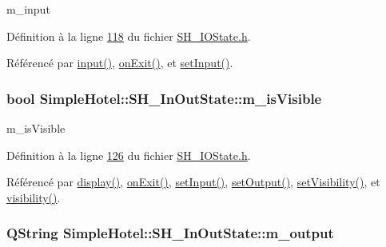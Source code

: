 m\-\_\-input 



Définition à la ligne \hyperlink{SH__IOState_8h_source_l00118}{118} du fichier \hyperlink{SH__IOState_8h_source}{S\-H\-\_\-\-I\-O\-State.\-h}.



Référencé par \hyperlink{classSimpleHotel_1_1SH__InOutState_a487d2ca6200fed372b1a27cfa27774db}{input()}, \hyperlink{classSimpleHotel_1_1SH__InOutState_aa5fc1b9281087bd8abcd6873d2a36009}{on\-Exit()}, et \hyperlink{classSimpleHotel_1_1SH__InOutState_a30d45824ca3c749427ac8d40479cf072}{set\-Input()}.

\hypertarget{classSimpleHotel_1_1SH__InOutState_a041ad53f3cdfb1b18ee002597e833848}{
\subsubsection[{m\-\_\-is\-Visible}]{\setlength{\rightskip}{0pt plus 5cm}bool Simple\-Hotel\-::\-S\-H\-\_\-\-In\-Out\-State\-::m\-\_\-is\-Visible\hspace{0.3cm}{\ttfamily [private]}}}\label{classSimpleHotel_1_1SH__InOutState_a041ad53f3cdfb1b18ee002597e833848}


m\-\_\-is\-Visible 



Définition à la ligne \hyperlink{SH__IOState_8h_source_l00126}{126} du fichier \hyperlink{SH__IOState_8h_source}{S\-H\-\_\-\-I\-O\-State.\-h}.



Référencé par \hyperlink{classSimpleHotel_1_1SH__InOutState_a1cbe5befe4f42e0941165498ed0117a9}{display()}, \hyperlink{classSimpleHotel_1_1SH__InOutState_aa5fc1b9281087bd8abcd6873d2a36009}{on\-Exit()}, \hyperlink{classSimpleHotel_1_1SH__InOutState_a30d45824ca3c749427ac8d40479cf072}{set\-Input()}, \hyperlink{classSimpleHotel_1_1SH__InOutState_a5e151d7b01cceb6766b6d83d4a9ac1aa}{set\-Output()}, \hyperlink{classSimpleHotel_1_1SH__InOutState_a2da1edbe247e9b2661c81c9dc2c7ef8d}{set\-Visibility()}, et \hyperlink{classSimpleHotel_1_1SH__InOutState_a145a6e0e2c9e22971e35aa4538adeb4a}{visibility()}.

\hypertarget{classSimpleHotel_1_1SH__InOutState_ab3dc360d32c8da2b958f8cdda90a8518}{
\subsubsection[{m\-\_\-output}]{\setlength{\rightskip}{0pt plus 5cm}Q\-String Simple\-Hotel\-::\-S\-H\-\_\-\-In\-Out\-State\-::m\-\_\-output\hspace{0.3cm}{\ttfamily [private]}}}\label{classSimpleHotel_1_1SH__InOutState_ab3dc360d32c8da2b958f8cdda90a8518}



